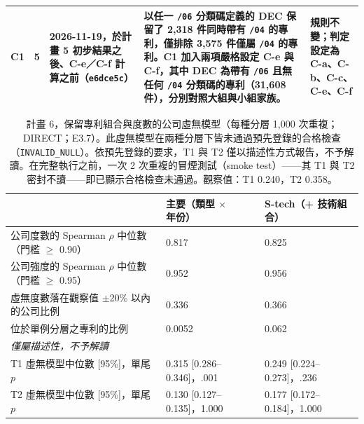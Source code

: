 \begin{table}[tbp]
\begin{tabular}{p{1.3cm}p{1.2cm}p{2.6cm}p{6.4cm}p{3.1cm}}
\addlinespace
\raggedright C1 & \raggedright 5 & \raggedright 2026-11-19，於計畫 5 初步結果之後、C-e／C-f 計算之前（\texttt{e6dce5c}） & \raggedright 以任一 \texttt{/06} 分類碼定義的 DEC 保留了 2,318 件同時帶有 \texttt{/04} 的專利，僅排除 3,575 件僅屬 \texttt{/04} 的專利。C1 加入兩項嚴格設定 C-e 與 C-f，其中 DEC 為帶有 \texttt{/06} 且無任何 \texttt{/04} 分類碼的專利（31,608 件），分別對照大組與小組家族。 & \raggedright 規則不變；判定設定為 C-a、C-b、C-c、C-e、C-f \tabularnewline
\bottomrule
\end{tabular}
\end{table}

\begin{table}[tbp]
\centering
\caption{計畫 6，保留專利組合與度數的公司虛無模型（每種分層 1,000 次重複；DIRECT；E3.7）。此虛無模型在兩種分層下皆未通過預先登錄的合格檢查（\texttt{INVALID\_\allowbreak NULL}）。依預先登錄的要求，T1 與 T2 僅以描述性方式報告，不予解讀。在完整執行之前，一次 2 次重複的冒煙測試（smoke test）——其 T1 與 T2 密封不讀——即已顯示合格檢查未通過。觀察值：T1 0.240，T2 0.358。}
\label{zh:tab:app_plan6}
\footnotesize
\setlength{\tabcolsep}{4pt}
\begin{tabular}{lll}
\toprule
& 主要（類型 $\times$ 年份） & S-tech（+ 技術組合） \\
\midrule
公司度數的 Spearman $\rho$ 中位數（門檻 $\geq$ 0.90） & 0.817 & 0.825 \\
公司強度的 Spearman $\rho$ 中位數（門檻 $\geq$ 0.95） & 0.952 & 0.956 \\
虛無度數落在觀察值 $\pm$20\% 以內的公司比例 & 0.336 & 0.366 \\
位於單例分層之專利的比例 & 0.0052 & 0.062 \\
\midrule
\multicolumn{3}{l}{\emph{僅屬描述性，不予解讀}} \\
T1 虛無模型中位數 [95\%]，單尾 $p$ & 0.315 [0.286--0.346]，.001 & 0.249 [0.224--0.273]，.236 \\
T2 虛無模型中位數 [95\%]，單尾 $p$ & 0.130 [0.127--0.135]，1.000 & 0.177 [0.172--0.184]，1.000 \\
\bottomrule
\end{tabular}
\end{table}

